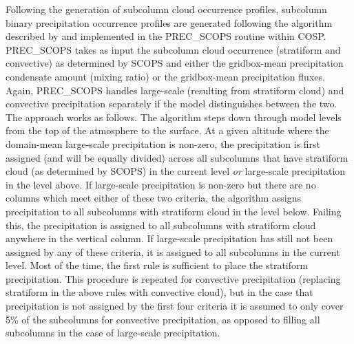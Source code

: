 Following the generation of subcolumn cloud occurrence profiles,
subcolumn binary precipitation occurrence profiles are generated
following the algorithm described by \citet{zhang_et_al_2010} and
implemented in the PREC\_SCOPS routine within COSP. PREC\_SCOPS takes as
input the subcolumn cloud occurrence (stratiform and convective) as
determined by SCOPS and either the gridbox-mean precipitation condensate
amount (mixing ratio) or the gridbox-mean precipitation fluxes. Again,
PREC\_SCOPS handles large-scale (resulting from stratiform cloud) and
convective precipitation separately if the model distinguishes between
the two. The approach works as follows. The algorithm steps down through
model levels from the top of the atmosphere to the surface. At a given
altitude where the domain-mean large-scale precipitation is non-zero,
the precipitation is first assigned (and will be equally divided) across
all subcolumns that have stratiform cloud (as determined by SCOPS) in
the current level \emph{or} large-scale precipitation in the level
above. If large-scale precipitation is non-zero but there are no columns
which meet either of these two criteria, the algorithm assigns
precipitation to all subcolumns with stratiform cloud in the level
below. Failing this, the precipitation is assigned to all subcolumns
with stratiform cloud anywhere in the vertical column. If large-scale
precipitation has still not been assigned by any of these criteria, it
is assigned to all subcolumns in the current level. Most of the time,
the first rule is sufficient to place the stratiform precipitation. This
procedure is repeated for convective precipitation (replacing stratiform
in the above rules with convective cloud), but in the case that
precipitation is not assigned by the first four criteria it is assumed
to only cover 5\% of the subcolumns for convective precipitation, as
opposed to filling all subcolumns in the case of large-scale
precipitation.


